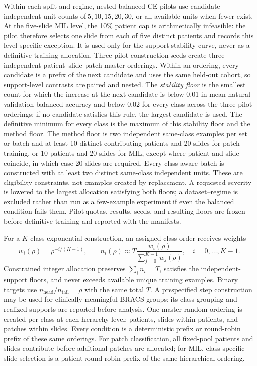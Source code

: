 \documentclass[11pt]{article}
\begin{document}
Within each split and regime, nested balanced CE pilots use candidate independent-unit counts of $5,10,15,20,30$, or all available units when fewer exist. At the five-slide MIL level, the \num{10}\% patient cap is arithmetically infeasible: the pilot therefore selects one slide from each of five distinct patients and records this level-specific exception. It is used only for the support-stability curve, never as a definitive training allocation. Three pilot construction seeds create three independent patient--slide--patch master orderings. Within an ordering, every candidate is a prefix of the next candidate and uses the same held-out cohort, so support-level contrasts are paired and nested. The \emph{stability floor} is the smallest count for which the increase at the next candidate is below \num{0.01} in mean natural-validation balanced accuracy and below \num{0.02} for every class across the three pilot orderings; if no candidate satisfies this rule, the largest candidate is used. The definitive minimum for every class is the maximum of this stability floor and the method floor. The method floor is two independent same-class examples per set or batch and at least 10 distinct contributing patients and 20 slides for patch training, or 10 patients and 20 slides for MIL, except where patient and slide coincide, in which case 20 slides are required. Every class-aware batch is constructed with at least two distinct same-class independent units. These are eligibility constraints, not examples created by replacement. A requested severity is lowered to the largest allocation satisfying both floors; a dataset--regime is excluded rather than run as a few-example experiment if even the balanced condition fails them. Pilot quotas, results, seeds, and resulting floors are frozen before definitive training and reported with the manifests.

For a $K$-class exponential construction, an assigned class order receives weights
\begin{equation}
  w_i(\rho)=\rho^{-i/(K-1)},\qquad
  n_i(\rho)\approx T\frac{w_i(\rho)}{\sum_{j=0}^{K-1}w_j(\rho)},
  \quad i=0,\ldots,K-1.
  \label{eq:construction}
\end{equation}
Constrained integer allocation preserves $\sum_i n_i=T$, satisfies the independent-support floors, and never exceeds available unique training examples. Binary targets use $n_{\mathrm{head}}/n_{\mathrm{tail}}=\rho$ with the same total $T$. A prespecified step construction may be used for clinically meaningful BRACS groups; its class grouping and realized supports are reported before analysis. One master random ordering is created per class at each hierarchy level: patients, slides within patients, and patches within slides. Every condition is a deterministic prefix or round-robin prefix of these same orderings. For patch classification, all fixed-pool patients and slides contribute before additional patches are allocated; for MIL, class-specific slide selection is a patient-round-robin prefix of the same hierarchical ordering.
\end{document}

